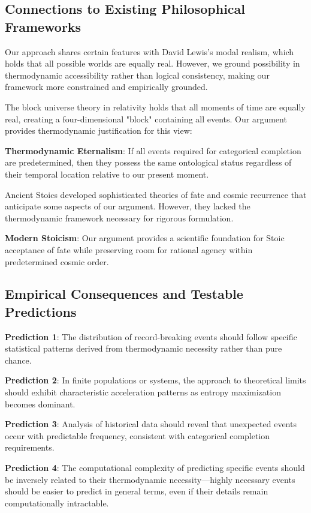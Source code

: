\documentclass[12pt,a4paper]{article}
\theoremstyle{definition}
\begin{document}
{\subsection{Connections to Existing Philosophical Frameworks}

Our approach shares certain features with David Lewis's modal realism, which holds that all possible worlds are equally real. However, we ground possibility in thermodynamic accessibility rather than logical consistency, making our framework more constrained and empirically grounded.

The block universe theory in relativity holds that all moments of time are equally real, creating a four-dimensional "block" containing all events. Our argument provides thermodynamic justification for this view:

\textbf{Thermodynamic Eternalism}: If all events required for categorical completion are predetermined, then they possess the same ontological status regardless of their temporal location relative to our present moment.

Ancient Stoics developed sophisticated theories of fate and cosmic recurrence that anticipate some aspects of our argument. However, they lacked the thermodynamic framework necessary for rigorous formulation.

\textbf{Modern Stoicism}: Our argument provides a scientific foundation for Stoic acceptance of fate while preserving room for rational agency within predetermined cosmic order.

\subsection{Empirical Consequences and Testable Predictions}

\textbf{Prediction 1}: The distribution of record-breaking events should follow specific statistical patterns derived from thermodynamic necessity rather than pure chance.

\textbf{Prediction 2}: In finite populations or systems, the approach to theoretical limits should exhibit characteristic acceleration patterns as entropy maximization becomes dominant.

\textbf{Prediction 3}: Analysis of historical data should reveal that unexpected events occur with predictable frequency, consistent with categorical completion requirements.

\textbf{Prediction 4}: The computational complexity of predicting specific events should be inversely related to their thermodynamic necessity—highly necessary events should be easier to predict in general terms, even if their details remain computationally intractable.

}
\end{document}
